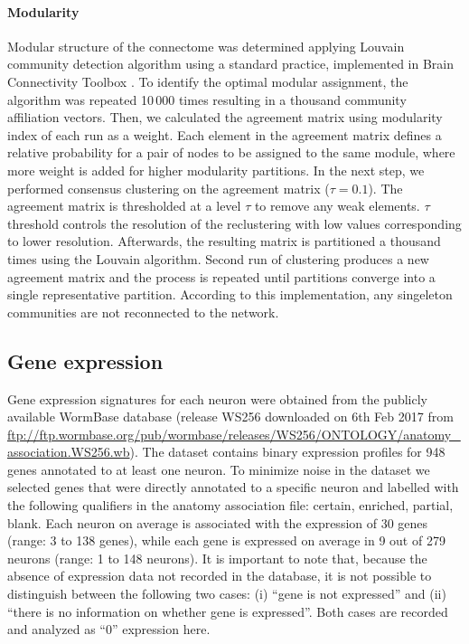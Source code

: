 \documentclass[10pt,letterpaper]{article}
\begin{document}
\paragraph{Modularity}
Modular structure of the connectome was determined applying Louvain community detection algorithm using a standard practice, implemented in Brain Connectivity Toolbox \cite{Rubinov2010}.
To identify the optimal modular assignment, the algorithm was repeated 10\,000 times resulting in a thousand community affiliation vectors.
Then, we calculated the agreement matrix using modularity index of each run as a weight.
Each element in the agreement matrix defines a relative probability for a pair of nodes to be assigned to the same module, where more weight is added for higher modularity partitions.
In the next step, we performed consensus clustering on the agreement matrix ($\tau=0.1$).
The agreement matrix is thresholded at a level $\tau$ to remove any weak elements.
$\tau$ threshold controls the resolution of the reclustering with low values corresponding to lower resolution.
Afterwards, the resulting matrix is partitioned a thousand times using the Louvain algorithm.
Second run of clustering produces a new agreement matrix and the process is repeated until partitions converge into a single representative partition.
According to this implementation, any singeleton communities are not reconnected to the network.

\subsection*{Gene expression}
Gene expression signatures for each neuron were obtained from the publicly available WormBase database (release WS256 downloaded on 6th Feb 2017 from \url{ftp://ftp.wormbase.org/pub/wormbase/releases/WS256/ONTOLOGY/anatomy_association.WS256.wb}).
The dataset contains binary expression profiles for 948 genes annotated to at least one neuron.
To minimize noise in the dataset we selected genes that were directly annotated to a specific neuron and labelled with the following qualifiers in the anatomy association file: certain, enriched, partial, blank.
Each neuron on average is associated with the expression of 30 genes (range: 3 to 138 genes), while each gene is expressed on average in 9 out of 279 neurons (range: 1 to 148 neurons).
It is important to note that, because the absence of expression data not recorded in the database, it is not possible to distinguish between the following two cases: (i) ``gene is not expressed'' and (ii) ``there is no information on whether gene is expressed''.
Both cases are recorded and analyzed as ``0'' expression here.
\end{document}
